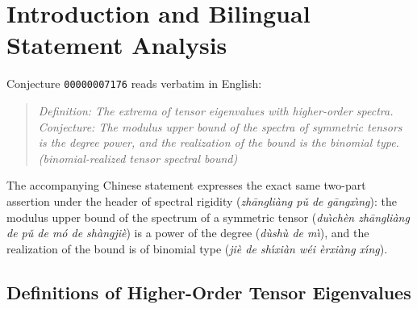 \documentclass[11pt]{article}
\theoremstyle{definition}
\begin{document}
\section{Introduction and Bilingual Statement Analysis}

Conjecture \texttt{00000007176} reads verbatim in English:
\begin{quote}
\emph{Definition: The extrema of tensor eigenvalues with higher-order spectra. Conjecture:
The modulus upper bound of the spectra of symmetric tensors is the degree power, and the
realization of the bound is the binomial type. (binomial-realized tensor spectral bound)}
\end{quote}
The accompanying Chinese statement expresses the exact same two-part assertion under the
header of spectral rigidity (\emph{zh\=angli\`ang p\v{u} de g\=angx\`\i ng}): the modulus
upper bound of the spectrum of a symmetric tensor (\emph{du\`\i ch\`en zh\=angli\`ang de
p\v{u} de m\'o de sh\`angji\`e}) is a power of the degree (\emph{d\`ush\`u de m\`\i}), and
the realization of the bound is of binomial type (\emph{ji\`e de sh\'\i xi\`an w\'ei
\`erxi\`ang x\'\i ng}).

\subsection{Definitions of Higher-Order Tensor Eigenvalues}
\end{document}
